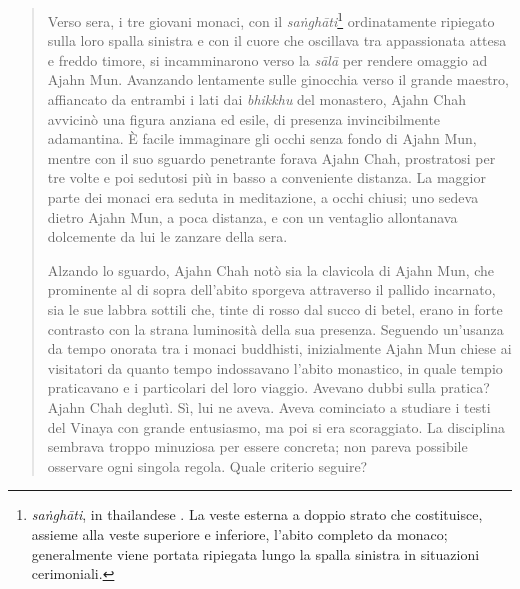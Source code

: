 \begin{quote}
Verso sera, i tre giovani monaci, con il \emph{saṅghāti}\footnote{\emph{saṅghāti},
  in thailandese . La veste esterna a doppio
  strato che costituisce, assieme alla veste superiore e inferiore,
  l'abito completo da monaco; generalmente viene portata ripiegata lungo
  la spalla sinistra in situazioni cerimoniali.} ordinatamente ripiegato
sulla loro spalla sinistra e con il cuore che oscillava tra appassionata
attesa e freddo timore, si incamminarono verso la \emph{sālā} per
rendere omaggio ad Ajahn Mun. Avanzando lentamente sulle ginocchia verso
il grande maestro, affiancato da entrambi i lati dai \emph{bhikkhu} del
monastero, Ajahn Chah avvicinò una figura anziana ed esile, di presenza
invincibilmente adamantina. È facile immaginare gli occhi senza fondo di
Ajahn Mun, mentre con il suo sguardo penetrante forava Ajahn Chah,
prostratosi per tre volte e poi sedutosi più in basso a conveniente
distanza. La maggior parte dei monaci era seduta in meditazione, a occhi
chiusi; uno sedeva dietro Ajahn Mun, a poca distanza, e con un ventaglio
allontanava dolcemente da lui le zanzare della sera.

Alzando lo sguardo, Ajahn Chah notò sia la clavicola di Ajahn Mun, che
prominente al di sopra dell'abito sporgeva attraverso il pallido
incarnato, sia le sue labbra sottili che, tinte di rosso dal succo di
betel, erano in forte contrasto con la strana luminosità della sua
presenza. Seguendo un'usanza da tempo onorata tra i monaci buddhisti,
inizialmente Ajahn Mun chiese ai visitatori da quanto tempo indossavano
l'abito monastico, in quale tempio praticavano e i particolari del loro
viaggio. Avevano dubbi sulla pratica? Ajahn Chah deglutì. Sì, lui ne
aveva. Aveva cominciato a studiare i testi del Vinaya con grande
entusiasmo, ma poi si era scoraggiato. La disciplina sembrava troppo
minuziosa per essere concreta; non pareva possibile osservare ogni
singola regola. Quale criterio seguire?


\end{quote}
